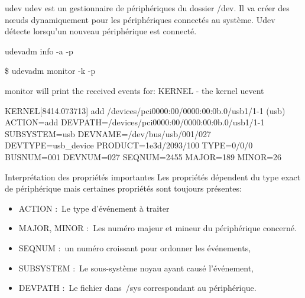 \documentclass{beamer}
\begin{document}
\begin{frame}
\begin{block}{udev} 
	udev est un gestionnaire de périphériques du dossier /dev. Il va créer des nœuds dynamiquement pour les périphériques connectés au système. 
	Udev détecte lorsqu'un nouveau périphérique est connecté. 
\end{block}
\end{frame}
\begin{frame}
\begin{exampleblock}{udevadm info -a -p} 
	
	\tiny{\$  udevadm monitor -k -p
		
		monitor will print the received events for:
		KERNEL - the kernel uevent
		
		KERNEL[8414.073713] add      /devices/pci0000:00/0000:00:0b.0/usb1/1-1 (usb)\newline
		ACTION=add\newline
		DEVPATH=/devices/pci0000:00/0000:00:0b.0/usb1/1-1\newline
		SUBSYSTEM=usb\newline
		DEVNAME=/dev/bus/usb/001/027\newline
		DEVTYPE=usb\_device\newline
		PRODUCT=1e3d/2093/100\newline
		TYPE=0/0/0\newline
		BUSNUM=001\newline
		DEVNUM=027\newline
		SEQNUM=2455\newline
		MAJOR=189\newline
		MINOR=26\newline}
\end{exampleblock}
 
\end{frame}

\begin{frame}
\begin{exampleblock}{Interprétation des propriétés importantes} 
Les propriétés dépendent du type exact de périphérique mais certaines propriétés sont toujours présentes:
\begin{itemize}
	[circle]
	\item ACTION : Le type d’événement à traiter
	\item MAJOR, MINOR : Les numéro majeur et mineur du périphérique concerné. 
    \item SEQNUM : un numéro croissant pour ordonner les événements, 
    \item SUBSYSTEM : Le sous-système noyau ayant causé l’événement, 
	\item DEVPATH : Le fichier dans /sys correspondant au périphérique. 
\end{itemize}
\end{exampleblock}
\end{frame}
\end{document}
